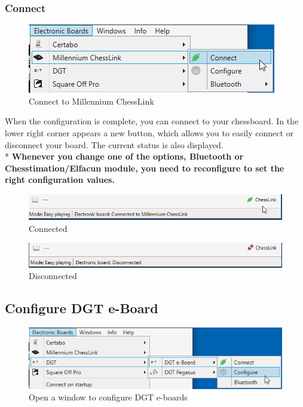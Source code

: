 \documentclass[11pt,a4paper]{article}
\begin{document}
\subsubsection{Connect}
\begin{figure}[H]
	\centering
	\includegraphics[scale=1.0]{MillenniumChessLink6.png}
	\caption{Connect to Millennium ChessLink}
	\label{fig:MillenniumChessLink6}
\end{figure}
When the configuration is complete, you can connect to your chessboard.
In the lower right corner appears a new button, which allows you to easily connect or disconnect your board. The current status is also displayed.\\
{\color{red}*}\textbf{ Whenever you change one of the options, Bluetooth or Chesstimation/Elfacun module, you need to reconfigure to set the right configuration values.}

\begin{figure}[H]
	\centering
	\includegraphics[scale=0.8]{MillenniumChessLink7.png}
	\caption{Connected}
	\label{fig:MillenniumChessLink7}
\end{figure}

\begin{figure}[H]
	\centering
	\includegraphics[scale=0.8]{MillenniumChessLink8.png}
	\caption{Disconnected}
	\label{fig:MillenniumChessLink8}
\end{figure}

\subsection{Configure DGT e-Board} \label{ConfigureDGTEBoard}
\begin{figure}[H]
	\centering
	\includegraphics[scale=0.8]{DGTEBoard1.png}
	\caption{Open a window to configure DGT e-boards }
	\label{fig:DGTEBoard1}
\end{figure}
\end{document}
